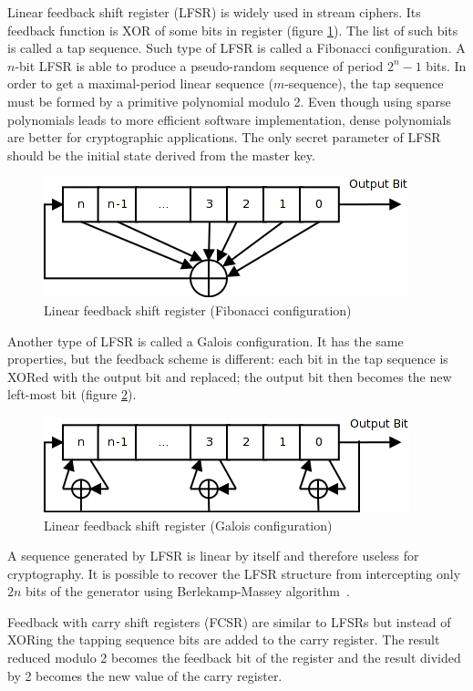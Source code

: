 Linear feedback shift register (LFSR) is widely used in stream ciphers. Its
feedback function is XOR of some bits in register (figure
\ref{fig:lfsr-fib}).  The list of such bits is called a tap sequence. Such type
of LFSR is called a Fibonacci configuration. A $n$-bit LFSR is able to produce a
pseudo-random sequence of period $2^n - 1$ bits. In order to get a
maximal-period linear sequence ($m$-sequence), the tap sequence must be formed
by a primitive polynomial modulo 2. Even though using sparse polynomials leads
to more efficient software implementation, dense polynomials are better for
cryptographic applications. The only secret parameter of LFSR should be the
initial state derived from the master key.
\begin{figure}[htbp]
    \centering
    \includegraphics[scale=0.5]{images/lfsr}
    \caption{Linear feedback shift register (Fibonacci configuration)}
    \label{fig:lfsr-fib}
\end{figure}
Another type of LFSR is called a Galois configuration. It has the same
properties, but the feedback scheme is different: each bit in the tap sequence
is XORed with the output bit and replaced; the output bit then becomes the new
left-most bit (figure \ref{fig:lfsr-galois}).
\begin{figure}[htbp]
    \centering
    \includegraphics[scale=0.5]{images/lfsr_galois}
    \caption{Linear feedback shift register (Galois configuration)}
    \label{fig:lfsr-galois}
\end{figure}
A sequence generated by LFSR is linear by itself and therefore useless for
cryptography. It is possible to recover the LFSR structure from intercepting
only $2n$ bits of the generator using Berlekamp-Massey algorithm~\cite{joux:algorithmic_cryptanalysis}. 

Feedback with carry shift registers (FCSR) are similar to LFSRs but instead of
XORing the tapping sequence bits are added to the carry register. The result
reduced modulo 2 becomes the feedback bit of the register and the result divided
by 2 becomes the new value of the carry register.

